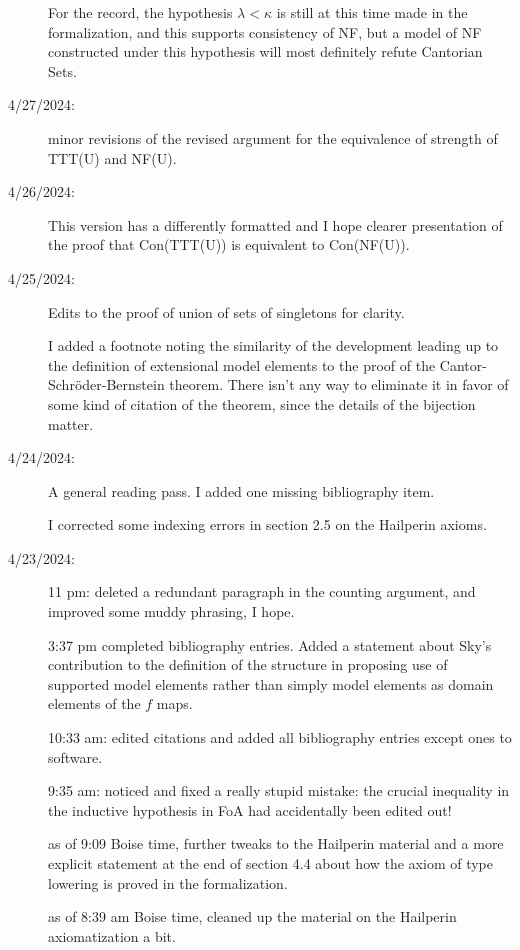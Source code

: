 \documentclass[112pt]{article}
\begin{document}
\begin{description}
For the record, the hypothesis $\lambda < \kappa$ is still at this time made in the formalization, and this supports consistency of NF, but a model of NF constructed under this hypothesis will most definitely refute Cantorian Sets.

\item[4/27/2024:]  minor revisions of the revised argument for the equivalence of strength of TTT(U) and NF(U).

\item[4/26/2024:]  This version has a differently formatted and I hope clearer presentation of the proof that Con(TTT(U)) is equivalent to Con(NF(U)).

\item[4/25/2024:]  Edits to the proof of union of sets of singletons for clarity.

I added a footnote noting the similarity of the development leading up to the definition of
extensional model elements to the proof of the Cantor-Schr\"oder-Bernstein theorem.  There isn't any way to eliminate it in favor of some kind of citation of the theorem, since the details of the bijection matter.

\item[4/24/2024:]  A general reading pass.  I added one missing bibliography item.

I corrected some indexing errors in section 2.5 on the Hailperin axioms.

\item[4/23/2024:]  

11 pm:  deleted a redundant paragraph in the counting argument, and improved some muddy phrasing, I hope.

3:37 pm completed bibliography entries.  Added a statement about Sky's contribution to the definition of the structure in proposing use of supported model elements rather than simply model elements as domain elements of the $f$ maps.

10:33 am:  edited citations and added all bibliography entries except ones to software.

9:35 am:  noticed and fixed a really stupid mistake:  the crucial inequality in the inductive hypothesis in FoA had accidentally been edited out!

as of 9:09 Boise time, further tweaks to the Hailperin material and a more explicit statement at the end of section 4.4 about how the axiom of type lowering is proved in the formalization.



as of 8:39 am Boise time, cleaned up the material on the Hailperin axiomatization a bit.


\end{description}
\end{document}

